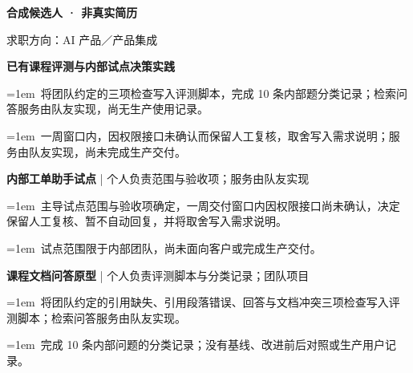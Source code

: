 \documentclass[11pt,a4paper,fontset=fandol]{ctexart}
\begin{document}
{\LARGE\bfseries 合成候选人 · 非真实简历}\par
求职方向：AI 产品／产品集成\par
\par\medskip{}\par\nobreak
\begin{minipage}{\linewidth}
\textbf{已有课程评测与内部试点决策实践}\par
\noindent\hangindent=1em\textbullet\ 将团队约定的三项检查写入评测脚本，完成 10 条内部题分类记录；检索问答服务由队友实现，尚无生产使用记录。\par
\end{minipage}\par
\noindent\hangindent=1em\textbullet\ 一周窗口内，因权限接口未确认而保留人工复核，取舍写入需求说明；服务由队友实现，尚未完成生产交付。\par
\par\medskip{}\par\nobreak
\begin{minipage}{\linewidth}
\textbf{内部工单助手试点} | 个人负责范围与验收项；服务由队友实现\par
\noindent\hangindent=1em\textbullet\ 主导试点范围与验收项确定，一周交付窗口内因权限接口尚未确认，决定保留人工复核、暂不自动回复，并将取舍写入需求说明。\par
\end{minipage}\par
\noindent\hangindent=1em\textbullet\ 试点范围限于内部团队，尚未面向客户或完成生产交付。\par
\begin{minipage}{\linewidth}
\textbf{课程文档问答原型} | 个人负责评测脚本与分类记录；团队项目\par
\noindent\hangindent=1em\textbullet\ 将团队约定的引用缺失、引用段落错误、回答与文档冲突三项检查写入评测脚本；检索问答服务由队友实现。\par
\end{minipage}\par
\noindent\hangindent=1em\textbullet\ 完成 10 条内部问题的分类记录；没有基线、改进前后对照或生产用户记录。\par
\end{document}
